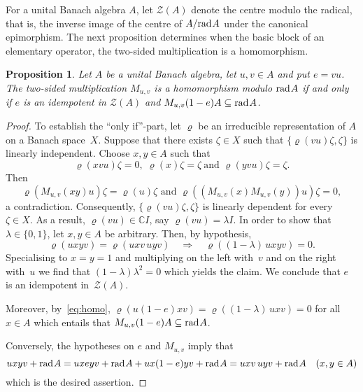 \documentclass[a4paper,12pt,reqno]{amsart}
\numberwithin{equation}{section}
\newtheorem{prop}[thm]{Proposition}
\theoremstyle{definition}
\begin{document}
For a unital Banach algebra $A$, let $\mathcal Z(A)$ denote the centre modulo the radical, that is, the inverse image
of the centre of $A/{{\textup{rad}\kern.7pt A}}$ under the canonical epimorphism. The next proposition determines when the basic block
of an elementary operator, the two-sided multiplication is a homomorphism.
\begin{prop}\label{mult-hom}
Let $A$ be a unital Banach algebra, let $u,v\in A$ and put $e=vu$. The two-sided multiplication $M_{u,v}$ is a homomorphism
modulo ${{\textup{rad}\kern.7pt A}}$ if and only if $e$ is an idempotent in $\mathcal Z (A)$ and $M_{u,v}(1-e)A\subseteq{{\textup{rad}\kern.7pt A}}$.
\end{prop}
\begin{proof}
To establish the ``only if''-part, let $\varrho$ be an irreducible representation of $A$ on a Banach space~$X$.
Suppose that there exists $\zeta \in X$ such that $\{ \varrho(vu) \zeta, \zeta\}$ is linearly independent. Choose $x,y \in A$ such that
\begin{equation*}
\varrho (xvu) \zeta=0,\;  \varrho (x) \zeta= \zeta\  \text {and } \varrho(yvu) \zeta= \zeta.
\end{equation*}
Then
\begin{equation*}
\varrho (M_{u,v} (xy) u) \zeta= \varrho (u) \zeta\text{ and }\varrho((M_{u,v} (x) M_{u,v} (y))u) \zeta=0,
\end{equation*}
a contradiction. Consequently, $\{ \varrho(vu) \zeta, \zeta\}$ is linearly dependent for every $\zeta \in X$. As a result, $\varrho (vu) \in {\mathbb{C}} I$,
say $\varrho (vu)=\lambda I$. In order to show that  $\lambda\in \{0,1\}$, let $x,y\in A$ be arbitrary. Then, by hypothesis,
\begin{equation}\label{eq:homo}
\varrho(uxyv)=\varrho(uxv\,uyv)\quad{}\Longrightarrow{}\quad\varrho((1-\lambda)\,uxyv)=0.
\end{equation}
Specialising to $x=y=1$ and multiplying on the left with~$v$ and on the right with~$u$ we find that $(1-\lambda)\lambda^2=0$
which yields the claim. We conclude that $e$ is an idempotent in~$\mathcal Z(A)$.

Moreover, by~\eqref{eq:homo}, $\varrho(u(1-e)xv)=\varrho((1-\lambda)\,uxv)=0$ for all $x\in A$ which entails that
$M_{u,v}(1-e)A\subseteq{{\textup{rad}\kern.7pt A}}$.

Conversely, the hypotheses on $e$ and $M_{u,v}$ imply that
\[
uxyv+{{\textup{rad}\kern.7pt A}}=uxeyv+{{\textup{rad}\kern.7pt A}} +ux(1-e)yv+{{\textup{rad}\kern.7pt A}}=uxv\,uyv+{{\textup{rad}\kern.7pt A}}\quad(x,y\in A)
\]
which is the desired assertion.
\end{proof}
\end{document}
